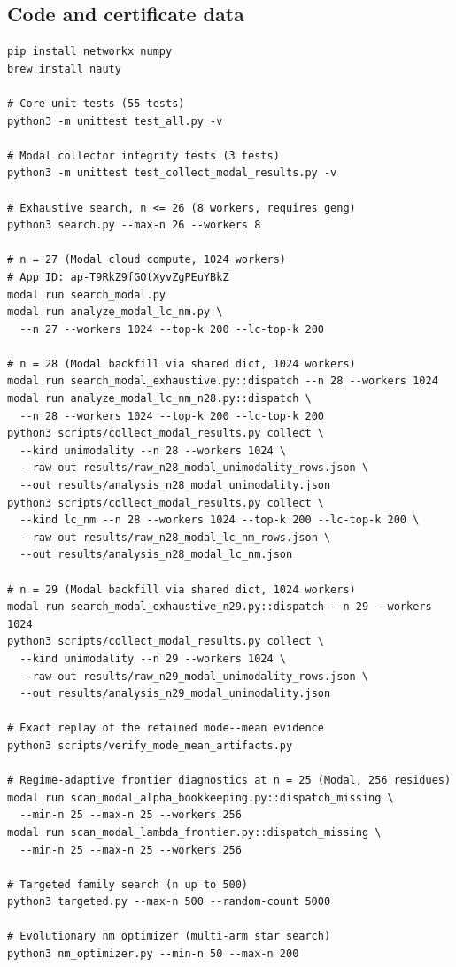 \documentclass[12pt,oneside]{article}
\theoremstyle{remark}
\begin{document}
\subsection{Code and certificate data}

\begin{verbatim}
pip install networkx numpy
brew install nauty

# Core unit tests (55 tests)
python3 -m unittest test_all.py -v

# Modal collector integrity tests (3 tests)
python3 -m unittest test_collect_modal_results.py -v

# Exhaustive search, n <= 26 (8 workers, requires geng)
python3 search.py --max-n 26 --workers 8

# n = 27 (Modal cloud compute, 1024 workers)
# App ID: ap-T9RkZ9fGOtXyvZgPEuYBkZ
modal run search_modal.py
modal run analyze_modal_lc_nm.py \
  --n 27 --workers 1024 --top-k 200 --lc-top-k 200

# n = 28 (Modal backfill via shared dict, 1024 workers)
modal run search_modal_exhaustive.py::dispatch --n 28 --workers 1024
modal run analyze_modal_lc_nm_n28.py::dispatch \
  --n 28 --workers 1024 --top-k 200 --lc-top-k 200
python3 scripts/collect_modal_results.py collect \
  --kind unimodality --n 28 --workers 1024 \
  --raw-out results/raw_n28_modal_unimodality_rows.json \
  --out results/analysis_n28_modal_unimodality.json
python3 scripts/collect_modal_results.py collect \
  --kind lc_nm --n 28 --workers 1024 --top-k 200 --lc-top-k 200 \
  --raw-out results/raw_n28_modal_lc_nm_rows.json \
  --out results/analysis_n28_modal_lc_nm.json

# n = 29 (Modal backfill via shared dict, 1024 workers)
modal run search_modal_exhaustive_n29.py::dispatch --n 29 --workers 1024
python3 scripts/collect_modal_results.py collect \
  --kind unimodality --n 29 --workers 1024 \
  --raw-out results/raw_n29_modal_unimodality_rows.json \
  --out results/analysis_n29_modal_unimodality.json

# Exact replay of the retained mode--mean evidence
python3 scripts/verify_mode_mean_artifacts.py

# Regime-adaptive frontier diagnostics at n = 25 (Modal, 256 residues)
modal run scan_modal_alpha_bookkeeping.py::dispatch_missing \
  --min-n 25 --max-n 25 --workers 256
modal run scan_modal_lambda_frontier.py::dispatch_missing \
  --min-n 25 --max-n 25 --workers 256

# Targeted family search (n up to 500)
python3 targeted.py --max-n 500 --random-count 5000

# Evolutionary nm optimizer (multi-arm star search)
python3 nm_optimizer.py --min-n 50 --max-n 200
\end{verbatim}
\end{document}
